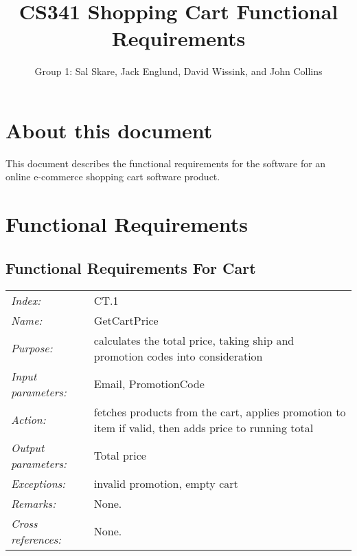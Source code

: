 \documentclass[10pt,letter]{article}
\begin{document}

\title{CS341 Shopping Cart Functional Requirements}

\author{Group 1: Sal Skare, Jack Englund, David Wissink, and John Collins}

\maketitle 

\section{About this document} This document describes the functional requirements for the 
software for an online e-commerce shopping cart software product.

\section{Functional Requirements}

\subsection{Functional Requirements For Cart}

\begin{tabularx}{\textwidth}{l X}
    \it{Index:} & CT.1 \\
    \it{Name:} & GetCartPrice \\
    \it{Purpose:} & calculates the total price, taking ship and promotion codes into consideration \\
    \it{Input parameters:} & Email, PromotionCode \\
    \it{Action:} &  fetches products from the cart, applies promotion to item if valid, then adds price to running total\\
    \it{Output parameters:} & Total price  \\
    \it{Exceptions:} &  invalid promotion, empty cart\\
    \it{Remarks:} & None. \\
    \it{Cross references:} & None. \\
    \hline
\end{tabularx}
\end{document}

